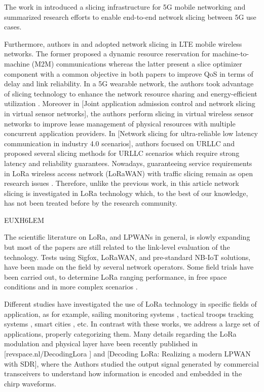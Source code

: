 
The work in \cite{nakao_end--end_2017} introduced a slicing infrastructure for 5G mobile networking and summarized research efforts to enable end-to-end network slicing between 5G use cases.

Furthermore,
	authors in \cite{gadallah_dynamic_2017} and \cite{rezende_adaptive_2018-1} adopted network slicing in LTE mobile wireless networks.
The former proposed a dynamic resource reservation for machine-to-machine (M2M) communications whereas the latter present a slice optimizer component with a common objective in both papers to improve QoS in terms of delay and link reliability.
In a 5G wearable network,
	the authors took advantage of slicing technology to enhance the network resource sharing and energy-efficient utilization \cite{hao_network_2018}.
Moreover in [Joint application admission control and network slicing in virtual sensor networks],
	the authors perform slicing in virtual wireless sensor networks to improve lease management of physical resources with multiple concurrent application providers.
In [Network slicing for ultra-reliable low latency communication in industry 4.0 scenarios],
	authors focused on URLLC and proposed several slicing methods for URLLC scenarios which require strong latency and reliability guarantees.
Nowadays,
	guaranteeing service requirements in LoRa wireless access network (LoRaWAN) with traffic slicing remain as open research issues \cite{adelantado_understanding_2017}.
Therefore,
	unlike the previous work,
	in this article network slicing is investigated in LoRa technology which,
	to the best of our knowledge,
	has not been treated before by the research community.

\cite{feltrin_lorawan_2018} EUXH6LEM

The scientific literature on LoRa,
	and LPWANs in general,
	is slowly expanding but most of the papers are still related to the link-level evaluation of the technology.
Tests using Sigfox,
	LoRaWAN,
	and pre-standard NB-IoT solutions,
	have been made on the field by several network operators.
Some field trials have been carried out,
	to determine LoRa ranging performance,
	in free space conditions \cite{aref_free_2014-1} and in more complex scenarios \cite{petajajarvi_coverage_2015}.

Different studies have investigated the use of LoRa technology in specific fields of application,
	as for example,
	sailing monitoring systems \cite{li_application_2017},
	tactical troops tracking systems \cite{san-um_long-range_2017},
	smart cities \cite{stan_overview_2016},
	etc.
In contrast with these works,
	we address a large set of applications,
	properly categorizing them.
Many details regarding the LoRa modulation and physical layer have been recently published in [revspace.nl/DecodingLora ] and [Decoding LoRa:
	Realizing a modern LPWAN with SDR],
	where the Authors studied the output signal generated by commercial transceivers to understand how information is encoded and embedded in the chirp waveforms.

